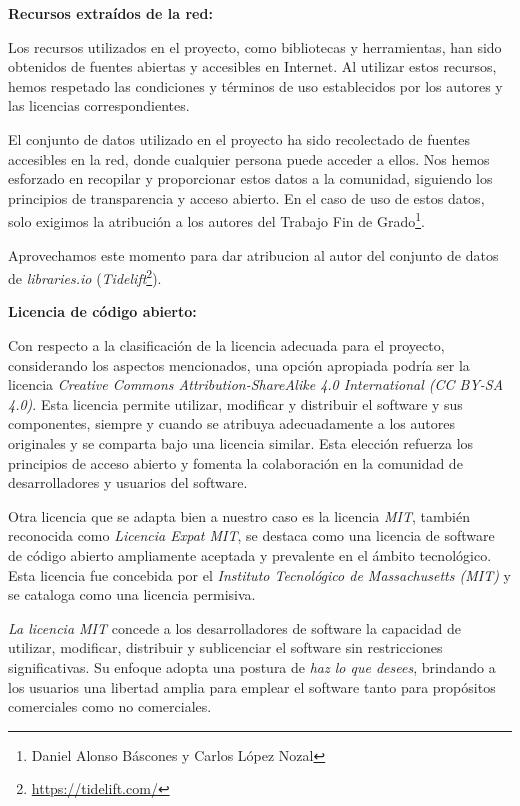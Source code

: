 \textbf{Recursos extraídos de la red:}

Los recursos utilizados en el proyecto, como bibliotecas y herramientas, han sido obtenidos 
de fuentes abiertas y accesibles en Internet. Al utilizar estos recursos, hemos respetado las condiciones y términos de 
uso establecidos por los autores y las licencias correspondientes.

El conjunto de datos utilizado en el proyecto ha sido recolectado de fuentes 
accesibles en la red, donde cualquier persona puede acceder a ellos. Nos hemos esforzado en recopilar y proporcionar estos 
datos a la comunidad, siguiendo los principios de transparencia y acceso abierto. En el caso de uso de estos datos, solo 
exigimos la atribución a los autores del Trabajo Fin de Grado\footnote{Daniel Alonso Báscones y Carlos López Nozal}.

Aprovechamos este momento para dar atribucion al autor del conjunto de datos de \textit{libraries.io} (\textit{Tidelift}\footnote{\url{https://tidelift.com/}}).

\textbf{Licencia de código abierto:}

Con respecto a la clasificación de la licencia adecuada para el proyecto, considerando los aspectos mencionados, una opción 
apropiada podría ser la licencia \textit{Creative Commons Attribution-ShareAlike 4.0 International (CC BY-SA 4.0)}\cite{enwiki:1161291260}. Esta licencia 
permite utilizar, modificar y distribuir el software y sus componentes, siempre y cuando se atribuya adecuadamente a los 
autores originales y se comparta bajo una licencia similar. Esta elección refuerza los principios de acceso abierto y 
fomenta la colaboración en la comunidad de desarrolladores y usuarios del software.

Otra licencia que se adapta bien a nuestro caso es la licencia \textit{MIT}\cite{enwiki:1152945138}, también reconocida como 
\textit{Licencia Expat MIT}, se destaca como una licencia de software de código abierto ampliamente aceptada y 
prevalente en el ámbito tecnológico. Esta licencia fue concebida por el \textit{Instituto Tecnológico de Massachusetts
(MIT)} y se cataloga como una licencia permisiva.

\textit{La licencia MIT} concede a los desarrolladores de software la capacidad de utilizar, modificar, distribuir 
y sublicenciar el software sin restricciones significativas. Su enfoque adopta una postura de \textit{haz lo que desees}, 
brindando a los usuarios una libertad amplia para emplear el software tanto para propósitos comerciales como no comerciales.


